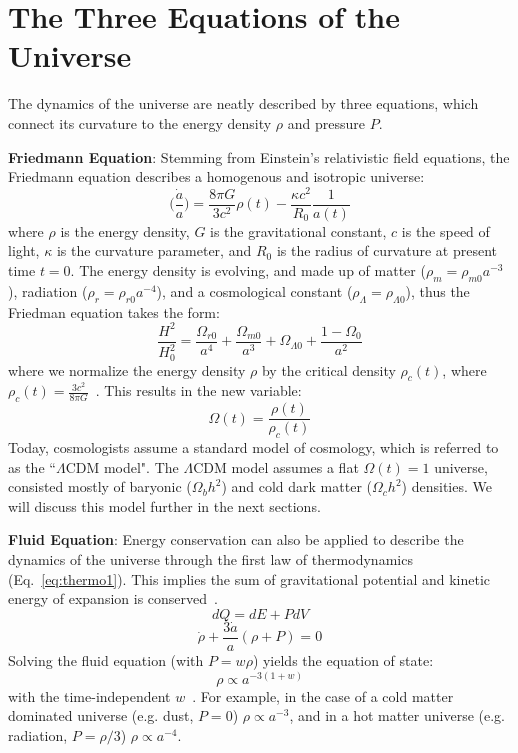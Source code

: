 \section{The Three Equations of the Universe}
The dynamics of the universe are neatly described by three equations, which connect its curvature to the energy density $\rho$ and pressure $P$.

\noindent
\textbf{Friedmann Equation}:  Stemming from Einstein's relativistic field equations, the Friedmann equation describes a homogenous and isotropic universe:  
\begin{equation}
    \bigg ( \frac{\Dot{a}}{a} \bigg ) = \frac{8\pi G}{3c^2}\rho(t) - \frac{\kappa c^2}{R_0}\frac{1}{a(t)}
\end{equation}
where $\rho$ is the energy density, $G$ is the gravitational constant, $c$ is the speed of light, $\kappa$ is the curvature parameter, and $R_0$ is the radius of curvature at present time $t=0$.  The energy density is evolving, and made up of matter ($\rho_m=\rho_{m0}a^{-3}$), radiation ($\rho_r=\rho_{r0}a^{-4}$), and a cosmological constant ($\rho_{\Lambda}=\rho_{\Lambda 0}$), thus the Friedman equation takes the form:
\begin{equation}
    \frac{H^2}{H_0^2} = \frac{\Omega_{r0}}{a^4} + \frac{\Omega_{m0}}{a^3} + \Omega_{\Lambda 0} + \frac{1-\Omega_0}{a^2}
\end{equation}
where we normalize the energy density $\rho$ by the critical density $\rho_c(t)$, where $\rho_c(t) = \frac{3c^2}{8\pi G}$~\cite{ryden_2016}.  This results in the new variable:
\begin{equation}
    \Omega(t) = \frac{\rho(t)}{\rho_c(t)}
\end{equation}
Today, cosmologists assume a standard model of cosmology, which is referred to as the ``$\Lambda$CDM model".  The $\Lambda$CDM model assumes a flat $\Omega(t)=1$ universe, consisted mostly of baryonic ($\Omega_b h^2$) and cold dark matter ($\Omega_c h^2$) densities.  We will discuss this model further in the next sections.

\noindent
\textbf{Fluid Equation}:  Energy conservation can also be applied to describe the dynamics of the universe through the first law of thermodynamics (Eq.~\ref{eq:thermo1}).  This implies the sum of gravitational potential and kinetic energy of expansion is conserved~\cite{ryden_2016}.
\begin{equation}
    dQ = dE + PdV
    \label{eq:thermo1}
\end{equation}
\begin{equation}
    \dot{\rho} + \frac{3\dot{a}}{a}(\rho + P) = 0
    \label{eq:fluid_universe}
\end{equation}
\noindent
Solving the fluid equation (with $P=w\rho$) yields the equation of state:
\begin{equation}
    \rho \propto a^{-3(1+w)}
\end{equation}
with the time-independent $w$~\cite{weinberg_cosmo}.  For example, in the case of a cold matter dominated universe (e.g. dust, $P = 0$) $\rho\propto a^{-3}$, and in a hot matter universe (e.g. radiation, $P=\rho/3$) $\rho\propto a^{-4}$.

